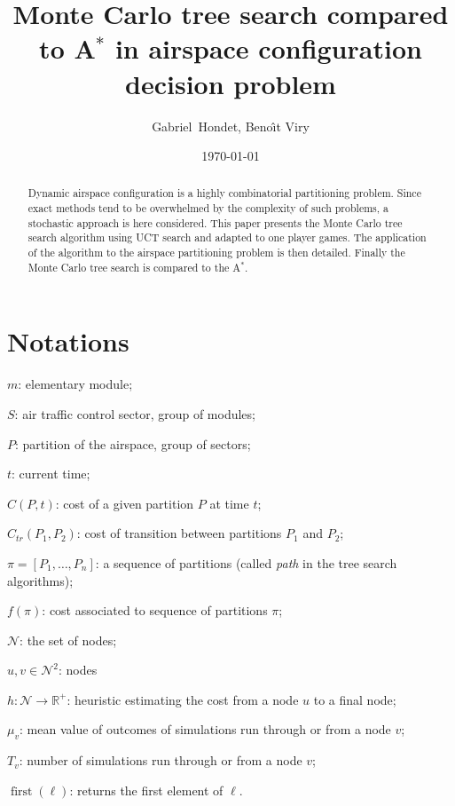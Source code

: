 \documentclass[oneside,twocolumn]{article}
\title{Monte Carlo tree search compared to A\(^*\) in airspace configuration
decision problem}
\author{Gabriel~Hondet, Beno\^{\i}t Viry}
\date{\today}
\DeclareMathOperator{\first}{first}
\begin{document}
\maketitle

\begin{abstract}
  Dynamic airspace configuration is a highly combinatorial partitioning
  problem. Since exact methods tend to be overwhelmed by the complexity of such
  problems, a stochastic approach is here considered. This paper presents the
  Monte Carlo tree search algorithm using UCT search and adapted to one
  player games. The application of the algorithm to the airspace partitioning
  problem is
  then detailed. Finally the Monte Carlo tree search is compared to the A\(^*\).
\end{abstract}


\section*{Notations}
\begin{compactitem}
  \item $m$: elementary module;
  \item $S$: air traffic control sector, group of modules;
  \item $P$: partition of the airspace, group of sectors;
  \item $t$: current time;
  \item $C(P, t)$: cost of a given partition $P$ at time $t$;
  \item \(C_{tr}(P_1, P_2)\): cost of transition between partitions \(P_1\) and
    \(P_2\);
  \item \(\pi = [P_1, \dots, P_n]\): a sequence of partitions (called \emph{path}
      in the tree search algorithms);
  \item \(f(\pi)\): cost associated to sequence of partitions \(\pi\);
  \item \(\mathcal{N}\): the set of nodes;
  \item \(u, v \in \mathcal{N}^2\): nodes
  \item $h \colon \mathcal{N} \to \mathbb{R}^+$: heuristic estimating the cost
    from a node \(u\) to a final node;
  \item \(\mu_v\): mean value of outcomes of simulations run through or from a
    node \(v\);
  \item \(T_v\): number of simulations run through or from a node \(v\);
  \item \(\first(\ell)\): returns the first element of \(\ell\).
\end{compactitem}
\end{document}
